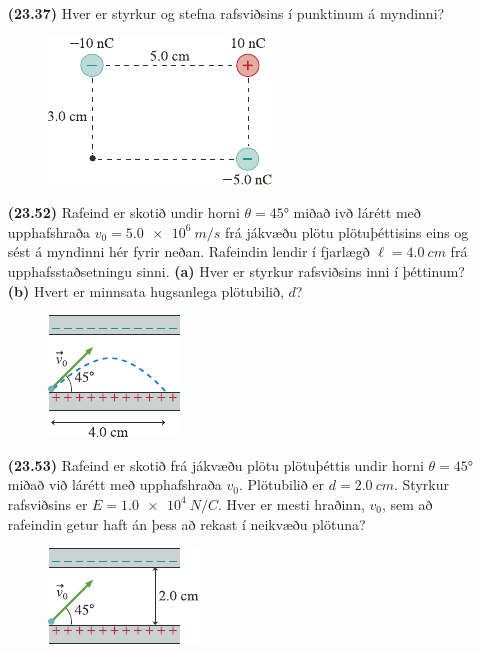 \ifdefined \wholebook \else\documentclass[oneside]{book}\usepackage{EdlBook}\graphicspath{{figures/}}
\begin{document}
\begin{enumerate}[label = \textbf{(\alph*)}]

\item[\textbf{(23.37)}] Hver er styrkur og stefna rafsviðsins í punktinum á myndinni?

\begin{figure}[H]
    \centering
    \includegraphics{figures/rk2337.pdf}
\end{figure}

\item[\textbf{(23.52)}] Rafeind er skotið undir horni $\theta = \ang{45}$ miðað ivð lárétt með upphafshraða $v_0 = \SI{5.0e6}{m/s}$ frá jákvæðu plötu plötuþéttisins eins og sést á myndinni hér fyrir neðan. Rafeindin lendir í fjarlægð $\ell = \SI{4.0}{cm}$ frá upphafsstaðsetningu sinni. \textbf{(a)} Hver er styrkur rafsviðsins inni í þéttinum? \textbf{(b)} Hvert er minnsata hugsanlega plötubilið, $d$?

\begin{figure}[H]
    \centering
    \includegraphics{figures/rk2352.pdf}
\end{figure}

\item[\textbf{(23.53)}] Rafeind er skotið frá jákvæðu plötu plötuþéttis undir horni $\theta = \ang{45}$ miðað við lárétt með upphafshraða $v_0$. Plötubilið er $d = \SI{2.0}{cm}$. Styrkur rafsviðsins er $E = \SI{1.0e4}{N/C}$. Hver er mesti hraðinn, $v_0$, sem að rafeindin getur haft án þess að rekast í neikvæðu plötuna?

\begin{figure}[H]
    \centering
    \includegraphics{figures/rk2353.pdf}
\end{figure}


\end{enumerate}
\end{document}
